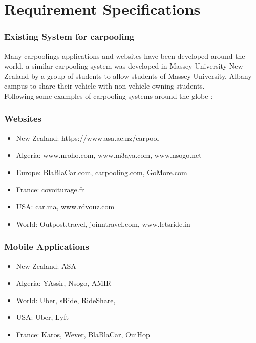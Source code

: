 \chapter{Requirement Specifications} \label{chap:reqs}

\subsection{Existing System for carpooling}
\justify
Many carpoolings applications and websites have been developed around the world. a similar carpooling system was developed in Massey University New Zealand by a group of students to allow students of Massey University, Albany campus to share their vehicle with non-vehicle owning students.
\\ Following some examples of carpooling systems around the globe : 

\subsection{Websites}
\begin{itemize}

\item New Zealand: https://www.asa.ac.nz/carpool
\item Algeria: www.nroho.com, www.m3aya.com, www.nsogo.net
\item Europe: BlaBlaCar.com, carpooling.com, GoMore.com
\item France: covoiturage.fr
\item USA: car.ma, www.rdvouz.com
\item World: Outpost.travel, joinntravel.com, www.letsride.in

\end{itemize}

\subsection{Mobile Applications}
\begin{itemize}

\item New Zealand: ASA
\item Algeria: YAssir, Nsogo, AMIR
\item World: Uber, sRide, RideShare, 
\item USA: Uber, Lyft
\item France: Karos, Wever, BlaBlaCar, OuiHop

\end{itemize}
